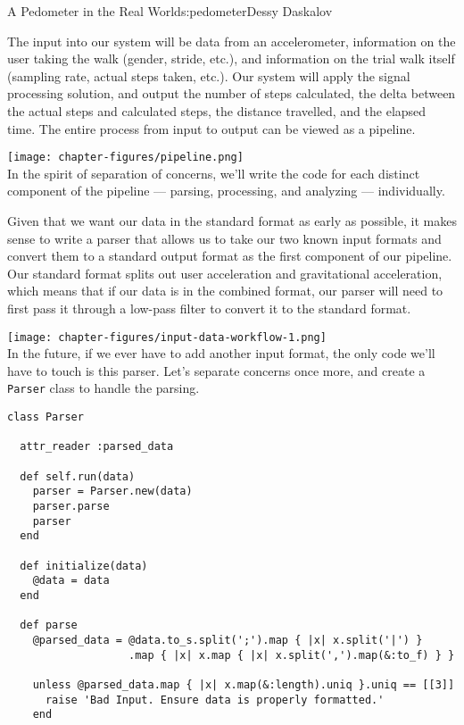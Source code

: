 \begin{aosachapter}{A Pedometer in the Real World}{s:pedometer}{Dessy Daskalov}
\label{the-pipeline}

The input into our system will be data from an accelerometer,
information on the user taking the walk (gender, stride, etc.), and
information on the trial walk itself (sampling rate, actual steps taken,
etc.). Our system will apply the signal processing solution, and output
the number of steps calculated, the delta between the actual steps and
calculated steps, the distance travelled, and the elapsed time. The
entire process from input to output can be viewed as a pipeline.

\texttt{[image: chapter-figures/pipeline.png]}\\ In the spirit of
separation of concerns, we'll write the code for each distinct component
of the pipeline --- parsing, processing, and analyzing --- individually.

\label{parsing}

Given that we want our data in the standard format as early as possible,
it makes sense to write a parser that allows us to take our two known
input formats and convert them to a standard output format as the first
component of our pipeline. Our standard format splits out user
acceleration and gravitational acceleration, which means that if our
data is in the combined format, our parser will need to first pass it
through a low-pass filter to convert it to the standard format.

\texttt{[image: chapter-figures/input-data-workflow-1.png]}\\ In the
future, if we ever have to add another input format, the only code we'll
have to touch is this parser. Let's separate concerns once more, and
create a \texttt{Parser} class to handle the parsing.

\begin{verbatim}
class Parser

  attr_reader :parsed_data

  def self.run(data)
    parser = Parser.new(data)
    parser.parse
    parser
  end

  def initialize(data)
    @data = data
  end

  def parse
    @parsed_data = @data.to_s.split(';').map { |x| x.split('|') }
                   .map { |x| x.map { |x| x.split(',').map(&:to_f) } }

    unless @parsed_data.map { |x| x.map(&:length).uniq }.uniq == [[3]]
      raise 'Bad Input. Ensure data is properly formatted.'
    end


\end{verbatim}
\end{aosachapter}
